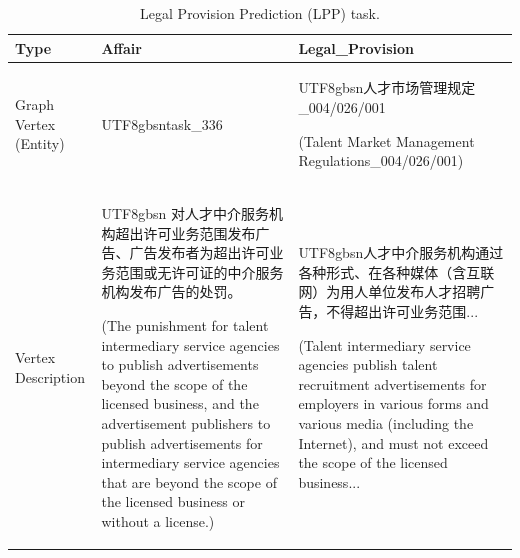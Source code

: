 \documentclass[runningheads]{llncs}
\begin{document}
\begin{table}[!htbp]
    \centering
     \caption{Legal Provision Prediction (LPP) task.}
    \begin{tabular}{p{2cm}|p{5cm}p{5cm}}
    \toprule
    \textbf{Type} & \textbf{Affair} & \textbf{Legal\_Provision} \\
    \midrule
   Graph Vertex (Entity) &   \begin{CJK}{UTF8}{gbsn}task\_336 \end{CJK}  &  \begin{CJK}{UTF8}{gbsn}人才市场管理规定\_004/026/001 \end{CJK}  (Talent Market Management Regulations\_004/026/001)  \\
   \midrule
   Vertex Description & \begin{CJK}{UTF8}{gbsn} 对人才中介服务机构超出许可业务范围发布广告、广告发布者为超出许可业务范围或无许可证的中介服务机构发布广告的处罚。\end{CJK} (The punishment for talent intermediary service agencies to publish advertisements beyond the scope of the licensed business, and the advertisement publishers to publish advertisements for intermediary service agencies that are beyond the scope of the licensed business or without a license.) &     
    \begin{CJK}{UTF8}{gbsn}人才中介服务机构通过各种形式、在各种媒体（含互联网）为用人单位发布人才招聘广告，不得超出许可业务范围...%
    \end{CJK}  (Talent intermediary service agencies publish talent recruitment advertisements for employers in various forms and various media (including the Internet), and must not exceed the scope of the licensed business... %
    \\
    \bottomrule
    \end{tabular}
    
    \label{lpp}
\end{table}
\end{document}
